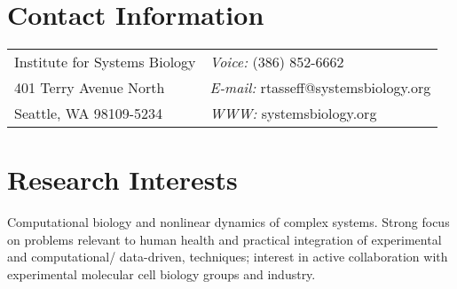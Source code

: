 \documentclass[margin,line]{res}
\begin{document}

\begin{resume}
\section{\sc Contact Information}
\vspace{.05in}
\begin{tabular}{@{}p{3in}p{4in}}
Institute for Systems Biology & {\it Voice:}  (386) 852-6662  \\            
401 Terry Avenue North   & {\it E-mail:}  rtasseff@systemsbiology.org   \\         
Seattle, WA 98109-5234 & {\it WWW:} systemsbiology.org\\         
\end{tabular}

%
\section{\sc Research Interests}
Computational biology and nonlinear dynamics of complex systems. 
Strong focus on problems relevant to human 
health and practical integration of experimental and computational/ data-driven, techniques; 
interest in active collaboration with experimental molecular
cell biology groups and industry.



\end{resume}
\end{document}
